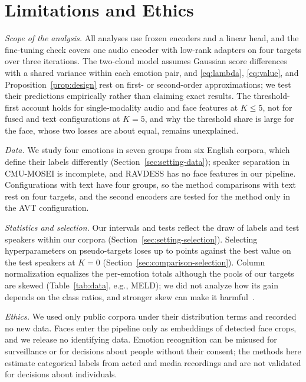 \section{Limitations and Ethics}
\label{sec:limitations-ethics}

\emph{Scope of the analysis.}
All analyses use frozen encoders and a linear head, and the fine-tuning check covers one audio encoder with low-rank adapters on four targets over three iterations.
The two-cloud model assumes Gaussian score differences with a shared variance within each emotion pair, and \eqref{eq:lambda}, \eqref{eq:value}, and Proposition~\ref{prop:design} rest on first- or second-order approximations; we test their predictions empirically rather than claiming exact results.
The threshold-first account holds for single-modality audio and face features at $K \le 5$, not for fused and text configurations at $K=5$, and why the threshold share is large for the face, whose two losses are about equal, remains unexplained.

\emph{Data.}
We study four emotions in seven groups from six English corpora, which define their labels differently (Section~\ref{sec:setting-data}); speaker separation in CMU-MOSEI is incomplete, and RAVDESS has no face features in our pipeline.
Configurations with text have four groups, so the method comparisons with text rest on four targets, and the second encoders are tested for the method only in the AVT configuration.

\emph{Statistics and selection.}
Our intervals and tests reflect the draw of labels and test speakers within our corpora (Section~\ref{sec:setting-selection}).
Selecting hyperparameters on pseudo-targets loses up to  points against the best value on the test speakers at $K=0$ (Section~\ref{sec:comparison-selection}).
Column normalization equalizes the per-emotion totals although the pools of our targets are skewed (Table~\ref{tab:data}, e.g., MELD); we did not analyze how its gain depends on the class ratios, and stronger skew can make it harmful~\cite{veilleux2021realistic}.

\emph{Ethics.}
We used only public corpora under their distribution terms and recorded no new data.
Faces enter the pipeline only as embeddings of detected face crops, and we release no identifying data.
Emotion recognition can be misused for surveillance or for decisions about people without their consent; the methods here estimate categorical labels from acted and media recordings and are not validated for decisions about individuals.
